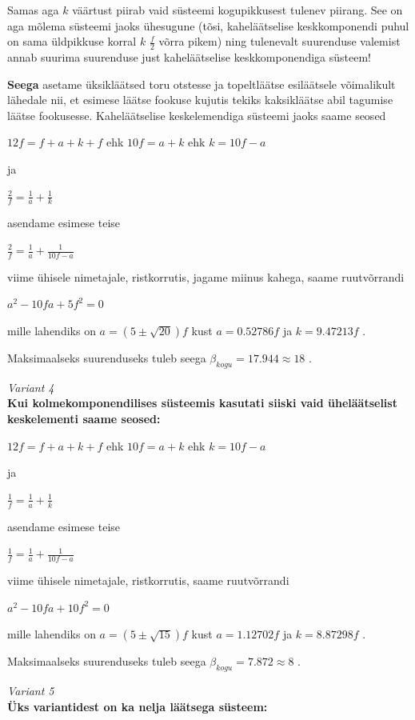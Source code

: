\documentclass[12pt,a5paper]{article}
\begin{document}
Samas aga $k$ väärtust piirab vaid süsteemi kogupikkusest tulenev piirang. See on aga mõlema süsteemi jaoks ühesugune (tõsi, kaheläätselise keskkomponendi puhul on sama üldpikkuse korral $k$ $ \frac{f}{2}$ võrra pikem) ning tulenevalt suurenduse valemist annab  suurima suurenduse just kaheläätselise keskkomponendiga süsteem!

\textbf{Seega} asetame üksikläätsed toru otstesse ja topeltläätse esiläätsele võimalikult lähedale nii, et esimese läätse fookuse kujutis tekiks kaksikläätse abil tagumise läätse fookusesse.
Kaheläätselise keskelemendiga süsteemi jaoks saame seosed

$ 12f = f + a + k + f $ ehk $ 10f = a + k $ ehk $ k = 10f - a $

ja

$ \frac{2}{f} = \frac{1}{a} + \frac{1}{k} $

asendame esimese teise

$ \frac {2}{f} = \frac {1}{a} + \frac {1}{10f - a} $

viime ühisele nimetajale, ristkorrutis, jagame miinus kahega, saame ruutvõrrandi

$ a^2 - 10fa + 5f^2 =0 $

mille lahendiks on $ a = (5 \pm \sqrt{20}) f $ kust $a=0.52786f $ ja $k=9.47213f$ .

Maksimaalseks suurenduseks tuleb seega $ {\beta}_{kogu} = 17.944 \approx 18 $ .


\emph{Variant 4}\\
\textbf {Kui kolmekomponendilises süsteemis kasutati siiski vaid üheläätselist keskelementi saame seosed:}

$ 12f = f + a + k + f $ ehk $ 10f = a + k $ ehk $ k = 10f - a $

ja

$ \frac {1}{f} = \frac{1}{a} + \frac{1}{k} $

asendame esimese teise

$ \frac {1}{f} = \frac {1}{a} + \frac {1}{10f - a} $

viime ühisele nimetajale, ristkorrutis, saame ruutvõrrandi

$ a^2 - 10fa + 10f^2 =0 $

mille lahendiks on $ a = (5 \pm \sqrt{15}) f $ kust $a=1.12702f $ ja $k=8.87298f$ .

Maksimaalseks suurenduseks tuleb seega $ {\beta}_{kogu} = 7.872 \approx 8 $ .

\emph{Variant 5}\\
\textbf {Üks variantidest on ka nelja läätsega süsteem:}
\end{document}
